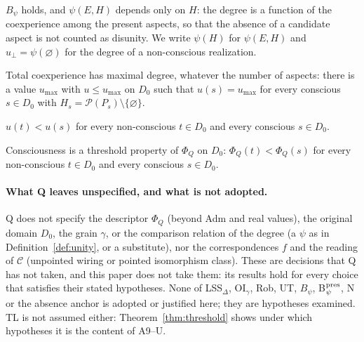 \begin{definition}\label{hyp:pres}
$B_\psi$ holds, and $\psi(E,H)$ depends only on $H$: the degree is a function of the coexperience among the present aspects, so that the absence of a candidate aspect is not counted as disunity. We write $\psi(H)$ for $\psi(E,H)$ and $u_\bot=\psi(\varnothing)$ for the degree of a non-conscious realization.
\end{definition}

\begin{definition}\label{hyp:N}
Total coexperience has maximal degree, whatever the number of aspects: there is a value $u_{\max}$ with $u\le u_{\max}$ on $D_0$ such that $u(s)=u_{\max}$ for every conscious $s\in D_0$ with $H_s=\mathcal P(P_s)\setminus\{\varnothing\}$.
\end{definition}

\begin{definition}\label{hyp:anchor}
$u(t)<u(s)$ for every non-conscious $t\in D_0$ and every conscious $s\in D_0$.
\end{definition}

\begin{definition}\label{def:TL}
Consciousness is a threshold property of $\Phi_Q$ on $D_0$: $\Phi_Q(t)<\Phi_Q(s)$ for every non-conscious $t\in D_0$ and every conscious $s\in D_0$.
\end{definition}

\paragraph{What Q leaves unspecified, and what is not adopted.} Q does not specify the descriptor $\Phi_Q$ (beyond Adm and real values), the original domain $D_0$, the grain $\gamma$, or the comparison relation of the degree (a $\psi$ as in Definition~\ref{def:unity}, or a substitute), nor the correspondences $f$ and the reading of $\mathcal C$ (unpointed wiring or pointed isomorphism class). These are decisions that Q has not taken, and this paper does not take them: its results hold for every choice that satisfies their stated hypotheses. None of LSS$_\Delta$, OI$_\gamma$, Rob, UT, $B_\psi$, B$_\psi^{\rm pres}$, N or the absence anchor is adopted or justified here; they are hypotheses examined. TL is not assumed either: Theorem~\ref{thm:threshold} shows under which hypotheses it is the content of A9--U.

